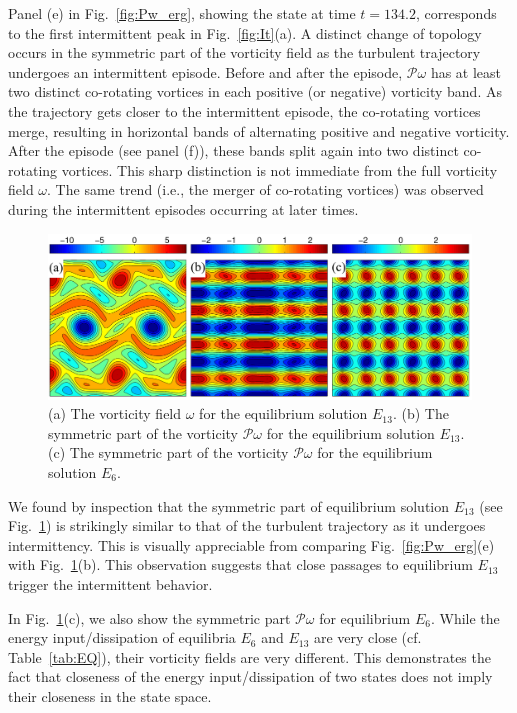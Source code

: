 \documentclass{article}
\begin{document}
Panel (e) in Fig.~\ref{fig:Pw_erg}, showing the state at time $t=134.2$,
corresponds to the first intermittent peak in Fig.~\ref{fig:It}(a). A
distinct change of topology occurs in the symmetric part of
the vorticity field as the turbulent trajectory undergoes an intermittent episode.
Before and after the episode, $\mathcal P\omega$ has at least two
distinct co-rotating vortices in each positive (or negative) vorticity band. As the trajectory
gets closer to the intermittent episode, the co-rotating vortices merge, resulting
in horizontal bands of alternating positive and negative vorticity. After the episode
(see panel (f)), these bands split again into two distinct co-rotating vortices.
This sharp distinction is not immediate from the full vorticity field $\omega$.
The same trend (i.e., the merger of co-rotating vortices) was observed during
the intermittent episodes occurring at later times.

\begin{figure}
\centering
\includegraphics[width=\textwidth]{E13}
\caption{
(a) The vorticity field $\omega$ for the equilibrium solution $E_{13}$.
(b) The symmetric part of the vorticity $\mathcal P\omega$ for the equilibrium solution $E_{13}$.
(c) The symmetric part of the vorticity $\mathcal P\omega$ for the equilibrium solution $E_{6}$.
}
\label{fig:E13}
\end{figure}

We found by inspection that the symmetric part of equilibrium solution $E_{13}$ (see Fig.~\ref{fig:E13})
is strikingly similar to that of the turbulent trajectory as it undergoes intermittency.
This is visually appreciable from comparing Fig.~\ref{fig:Pw_erg}(e) with Fig.~\ref{fig:E13}(b).
This observation suggests that close passages to equilibrium $E_{13}$ trigger the intermittent
behavior.

In Fig.~\ref{fig:E13}(c), we also show the symmetric part $\mathcal P\omega$ for
equilibrium $E_6$. While the energy input/dissipation of equilibria
$E_6$ and $E_{13}$ are very close (cf. Table~\ref{tab:EQ}), their vorticity fields are very
different. This demonstrates the fact that closeness of the energy input/dissipation of two states
does not imply their closeness in the state space.
\end{document}
